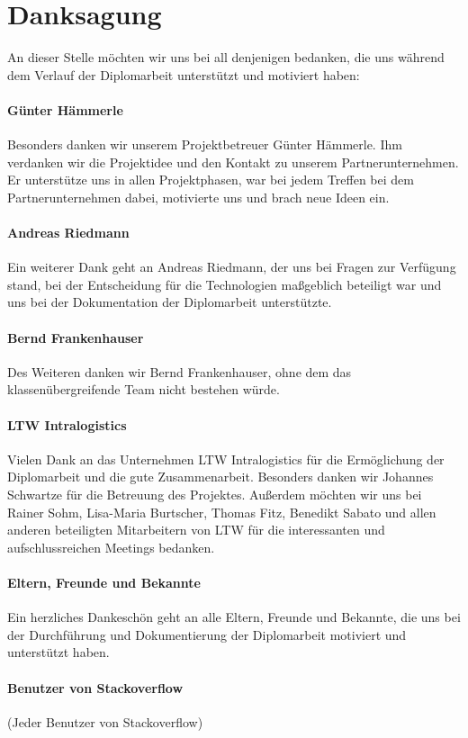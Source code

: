 \section*{Danksagung}

An dieser Stelle möchten wir uns bei all denjenigen bedanken, die uns während dem Verlauf der Diplomarbeit unterstützt und motiviert haben: \\ 
\paragraph*{Günter Hämmerle}Besonders danken wir unserem Projektbetreuer Günter Hämmerle. Ihm verdanken wir die Projektidee und den Kontakt zu unserem Partnerunternehmen. Er unterstütze uns in allen Projektphasen, war bei jedem Treffen bei dem Partnerunternehmen dabei, motivierte uns und brach neue Ideen ein.
\paragraph*{Andreas Riedmann}Ein weiterer Dank geht an Andreas Riedmann, der uns bei Fragen zur Verfügung stand, bei der Entscheidung für die Technologien maßgeblich beteiligt war und uns bei der Dokumentation der Diplomarbeit unterstützte.
\paragraph*{Bernd Frankenhauser}Des Weiteren danken wir Bernd Frankenhauser, ohne dem das klassenübergreifende Team nicht bestehen würde.
\paragraph*{LTW Intralogistics}Vielen Dank an das Unternehmen LTW Intralogistics für die Ermöglichung der Diplomarbeit und die gute Zusammenarbeit. Besonders danken wir Johannes Schwartze für die Betreuung des Projektes. Außerdem möchten wir uns bei Rainer Sohm, Lisa-Maria Burtscher, Thomas Fitz, Benedikt Sabato und allen anderen beteiligten Mitarbeitern von LTW für die interessanten und aufschlussreichen Meetings bedanken.
\paragraph*{Eltern, Freunde und Bekannte}Ein herzliches Dankeschön geht an alle Eltern, Freunde und Bekannte, die uns bei der Durchführung und Dokumentierung der Diplomarbeit motiviert und unterstützt haben.
\paragraph*{Benutzer von Stackoverflow}(Jeder Benutzer von Stackoverflow) 
